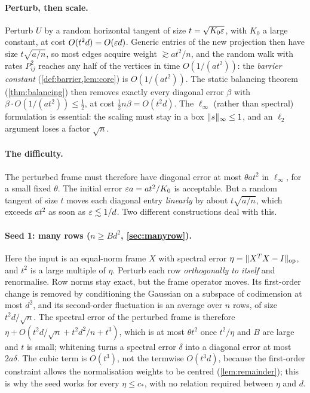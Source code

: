 \paragraph{Perturb, then scale.}
Perturb $U$ by a random horizontal tangent of size $t=\sqrt{K_0\varepsilon}$, with
$K_0$ a large constant, at cost $O(t^2d)=O(\varepsilon d)$. Generic entries of the new
projection then have size $t\sqrt{a/n}$, so most edges acquire weight
$\gtrsim at^2/n$, and the random walk with rates $P_{ij}^2$ reaches any half of
the vertices in time $O(1/(at^2))$: the \emph{barrier constant}
(\cref{def:barrier,lem:core}) is $O(1/(at^2))$. The static balancing theorem
(\cref{thm:balancing}) then removes exactly every diagonal error $\beta$ with
$\beta\cdot O(1/(at^2))\le\frac12$, at cost $\frac12n\beta=O(t^2d)$. The
$\ell_\infty$ (rather than spectral) formulation is essential: the scaling must
stay in a box $\lVert s\rVert_\infty\le1$, and an $\ell_2$ argument loses a factor
$\sqrt n$.

\paragraph{The difficulty.}
The perturbed frame must therefore have diagonal error at most $\theta at^2$ in
$\ell_\infty$, for a small fixed $\theta$. The initial error $\varepsilon a=at^2/K_0$
is acceptable. But a random tangent of size $t$ moves each diagonal entry
\emph{linearly} by about $t\sqrt{a/n}$, which exceeds $at^2$ as soon as
$\varepsilon\lesssim1/d$. Two different constructions deal with this.

\paragraph{Seed 1: many rows ($n\ge Bd^2$, \cref{sec:manyrow}).}
Here the input is an equal-norm frame $X$ with spectral error
$\eta=\lVert X^TX-I\rVert_{\mathrm{op}}$, and $t^2$ is a large multiple of $\eta$. Perturb each row
\emph{orthogonally to itself} and renormalise. Row norms stay exact, but the
frame operator moves. Its first-order change is removed by conditioning the
Gaussian on a subspace of codimension at most $d^2$, and its second-order
fluctuation is an average over $n$ rows, of size $t^2d/\sqrt n$. The spectral
error of the perturbed frame is therefore $\eta+O(t^2d/\sqrt n+t^2d^2/n+t^3)$,
which is at most $\theta t^2$ once $t^2/\eta$ and $B$ are large and $t$ is
small; whitening turns a spectral error $\delta$ into a diagonal error at most
$2a\delta$. The cubic term is $O(t^3)$, not the termwise $O(t^3d)$, because the
first-order constraint allows the normalisation weights to be centred
(\cref{lem:remainder}); this is why the seed works for every $\eta\le c_*$,
with no relation required between $\eta$ and $d$.

